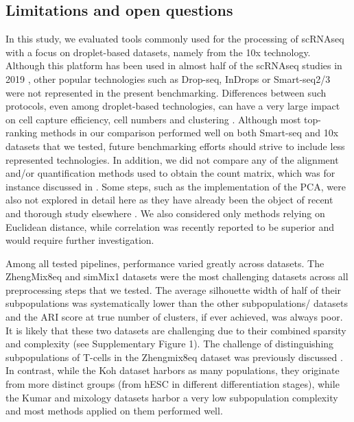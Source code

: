 \documentclass{bmcart}
\begin{document}
\subsection*{Limitations and open questions}

In this study, we evaluated tools commonly used for the processing of scRNAseq with a focus on droplet-based datasets, namely from the 10x technology. Although this platform has been used in almost half of the scRNAseq studies in 2019 \cite{SvenssonDB2019}, other popular technologies such as Drop-seq, InDrops or Smart-seq2/3 were not represented in the present benchmarking. Differences between such protocols, even among droplet-based technologies, can have a very large impact on cell capture efficiency, cell numbers and clustering \cite{MereuCellAtlas2019, ZhangDroplet2019, SalomonDroplet2019}. Although most top-ranking methods in our comparison performed well on both Smart-seq and 10x datasets that we tested, future benchmarking efforts should strive to include less represented technologies. In addition, we did not compare any of the alignment and/or quantification methods used to obtain the count matrix, which was for instance discussed in \cite{viethSystematic2019}. Some steps, such as the implementation of the PCA, were also not explored in detail here as they have already been the object of recent and thorough study elsewhere \cite{SunDimRed2019, TsuyuzakiPCA2020}. We also considered only methods relying on Euclidean distance, while correlation was recently reported to be superior \cite{kim_impact_2019} and would require further investigation.

{\color{red}Among all tested pipelines, performance varied greatly across datasets. The ZhengMix8eq and simMix1 datasets were the most challenging datasets across all preprocessing steps that we tested. The average silhouette width of half of their subpopulations was systematically lower than the other subpopulations/ datasets and the ARI score at true number of clusters, if ever achieved, was always poor. It is likely that these two datasets are challenging due to their combined sparsity and complexity (see Supplementary Figure 1). The challenge of distinguishing subpopulations of T-cells in the Zhengmix8eq dataset was previously discussed \cite{duoClustering2018}. In contrast, while the Koh dataset harbors as many populations, they originate from more distinct groups (from hESC in different differentiation stages), while the Kumar and mixology datasets harbor a very low subpopulation complexity and most methods applied on them performed well.}
\end{document}
